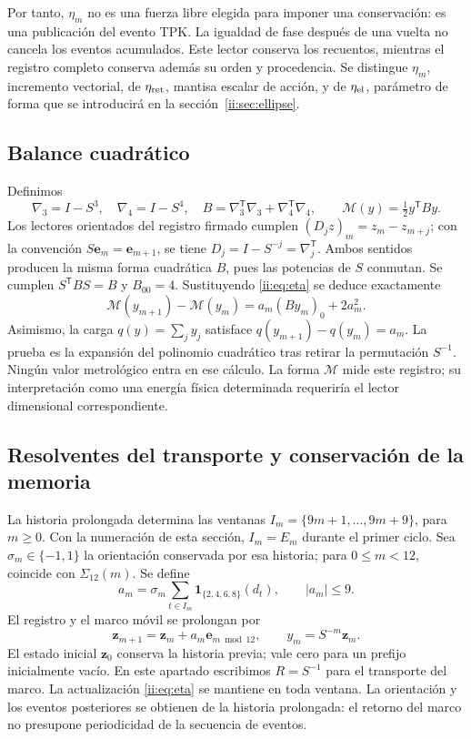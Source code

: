 Por tanto, $\eta_m$ no es una fuerza libre elegida para imponer una
conservación: es una publicación del evento TPK. La igualdad de fase
después de una vuelta no cancela los eventos acumulados. Este lector
conserva los recuentos, mientras el registro completo conserva además su
orden y procedencia. Se distingue $\eta_m$, incremento vectorial, de
$\eta_{\rm ret}$, mantisa escalar de acción, y de $\eta_{\rm el}$,
parámetro de forma que se introducirá en la sección~\ref{ii:sec:ellipse}.

\subsection{Balance cuadrático}
Definimos
\[
\nabla_3=I-S^3,\quad \nabla_4=I-S^4,\quad
B=\nabla_3^{\mathsf T}\nabla_3+\nabla_4^{\mathsf T}\nabla_4,\qquad
\mathcal M(y)=\tfrac12 y^{\mathsf T}By.
\]
Los lectores orientados del registro firmado cumplen
$(D_jz)_m=z_m-z_{m+j}$; con la convención
$S\mathbf e_m=\mathbf e_{m+1}$, se tiene
$D_j=I-S^{-j}=\nabla_j^{\mathsf T}$. Ambos sentidos producen la misma
forma cuadrática $B$, pues las potencias de $S$ conmutan.
Se cumplen $S^{\mathsf T}BS=B$ y $B_{00}=4$. Sustituyendo
\eqref{ii:eq:eta} se deduce exactamente
\begin{equation}
\mathcal M(y_{m+1})-\mathcal M(y_m)
=a_m(By_m)_0+2a_m^2.
\label{ii:ii:mem:balance}
\end{equation}
Asimismo, la carga $q(y)=\sum_jy_j$ satisface
$q(y_{m+1})-q(y_m)=a_m$.
La prueba es la expansión del polinomio cuadrático tras retirar la
permutación $S^{-1}$. Ningún valor metrológico entra en ese cálculo.
La forma $\mathcal M$ mide este registro; su interpretación como una
energía física determinada requeriría el lector dimensional correspondiente.


\subsection{Resolventes del transporte y conservación de la memoria}
\label{ii:subsec:ii-memoria-resolvente}

La historia prolongada determina las ventanas
\(I_m=\{9m+1,\ldots,9m+9\}\), para \(m\geq0\).
Con la numeración de esta sección, \(I_m=E_m\) durante el primer ciclo.
Sea \(\sigma_m\in\{-1,1\}\) la orientación conservada por esa historia;
para \(0\leq m<12\), coincide con \(\Sigma_{12}(m)\). Se define
\[
 a_m=\sigma_m\sum_{t\in I_m}\mathbf1_{\{2,4,6,8\}}(d_t),
 \qquad |a_m|\leq9.
\]
El registro y el marco móvil se prolongan por
\[
 \mathbf z_{m+1}=\mathbf z_m+a_m\mathbf e_{m\bmod12},\qquad y_m=S^{-m}\mathbf z_m.
\]
El estado inicial \(\mathbf z_0\) conserva la historia previa; vale cero para
un prefijo inicialmente vacío. En este apartado escribimos
\(R=S^{-1}\) para el transporte del marco. La actualización
\eqref{ii:eq:eta} se mantiene en toda ventana. La orientación y los eventos
posteriores se obtienen de la historia prolongada: el retorno del marco
no presupone periodicidad de la secuencia de eventos.

